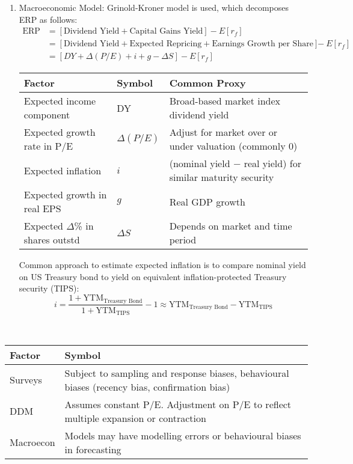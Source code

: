 \begin{method}
\begin{enumerate}[label=\roman*.]
\item Macroeconomic Model: Grinold-Kroner model is used, which decomposes ERP as follows:
\begin{align}
\text{ERP} &= [\text{Dividend Yield} + \text{Capital Gains Yield}] - E[r_f] \nonumber \\
&= [\text{Dividend Yield} + \text{Expected Repricing} + \text{Earnings Growth per Share}] - E[r_f] \nonumber \\
&= \left[DY + \Delta (P/E) + i + g - \Delta S \right] - E[r_f] \nonumber
\end{align}
\begin{tabularx}{\textwidth}{p{14em}|p{4em}|X}
\hline
\rowcolor{gray!30}
Factor & Symbol & Common Proxy \\
\hline
Expected income component & DY & Broad-based market index dividend yield \\
\hline
Expected growth rate in P/E & $\Delta (P/E)$ & Adjust for market over or under valuation (commonly $0$) \\	
\hline
Expected inflation & $i$ & (nominal yield $-$ real yield) for similar maturity security \\
\hline
Expected growth in real EPS & $g$ & Real GDP growth \\
\hline
Expected $\Delta$\% in shares outstd & $\Delta S$ & Depends on market and time period \\
\hline
\end{tabularx}
Common approach to estimate expected inflation is to compare nominal yield on US Treasury bond to yield on equivalent inflation-protected Treasury security (TIPS):
\begin{equation}
i = \frac{1 + \text{YTM}_{\text{Treasury Bond}}}{1 + \text{YTM}_{\text{TIPS}}} - 1 \approx \text{YTM}_{\text{Treasury Bond}} - \text{YTM}_{\text{TIPS}} \nonumber
\end{equation}
\end{enumerate}
\end{method}

\begin{remark} \\
\begin{tabularx}{\textwidth}{p{5em}|X}
\hline
\rowcolor{gray!30}
Factor & Symbol \\
\hline
Surveys & Subject to sampling and response biases, behavioural biases (recency bias, confirmation bias) \\
\hline
DDM & Assumes constant P/E. Adjustment on P/E to reflect multiple expansion or contraction \\
\hline
Macroecon & Models may have modelling errors or behavioural biases in forecasting \\
\hline
\end{tabularx}
\end{remark}

